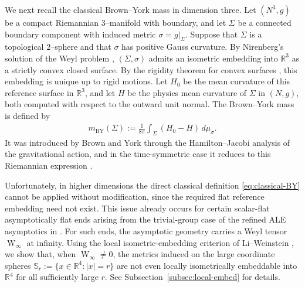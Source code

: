 \documentclass[10pt]{amsart}
\newcommand{\R}{\mathbb{R}}
\newcommand{\Sph}{\mathbb{S}}
\newcommand{\Weyl}{\operatorname{W}}
\theoremstyle{plain}
\theoremstyle{remark}
\begin{document}
	We next recall the classical Brown--York mass in dimension three. Let $(N^3,g)$ be a compact Riemannian
	$3$--manifold with boundary, and let $\Sigma$ be a connected boundary
	component with induced metric $\sigma=g|_\Sigma$. Suppose that $\Sigma$ is
	a topological $2$--sphere and that $\sigma$ has positive Gauss curvature.
	By Nirenberg's solution of the Weyl problem \cite{Nirenberg},
	$(\Sigma,\sigma)$ admits an isometric embedding into $\mathbb R^3$
	as a strictly convex closed surface. By the rigidity theorem for
	convex surfaces \cite{CohnVossen}, this embedding is unique up to
	rigid motions. Let $H_0$ be
	the mean curvature of this reference surface in $\mathbb R^3$, and let
	$H$ be the physics mean curvature of $\Sigma$ in $(N,g)$, both computed with
	respect to the outward unit normal. The Brown--York mass is defined by
	\begin{align}\label{eq:classical-BY}
		m_{\mathrm{BY}}(\Sigma)
		:=
		\frac{1}{8\pi}
		\int_{\Sigma}(H_0-H)\,d\mu_\sigma .
	\end{align}
	It was introduced by Brown and York through the Hamilton--Jacobi analysis
	of the gravitational action, and in the time-symmetric case it reduces to
	this Riemannian expression \cite{BrownYork}.
	
	Unfortunately, in higher dimensions the direct classical definition
	\eqref{eq:classical-BY} cannot be applied without modification, since the
	required flat reference embedding need not exist.  This issue already occurs
	for certain scalar-flat asymptotically flat ends arising from the
	trivial-group case of the refined ALE asymptotics in \cite{YouALE26}.  For
	such ends, the asymptotic geometry carries a Weyl tensor
	$\Weyl_\infty$ at infinity.  Using the local isometric-embedding criterion
	of Li--Weinstein \cite{LiWeinstein}, we show that, when
	$\Weyl_\infty\neq0$, the metrics induced on the large coordinate spheres
	$\Sph_r:=\{x\in\R^4:|x|=r\}$ are not even locally isometrically embeddable
	into $\R^4$ for all sufficiently large $r$.  See
	Subsection~\ref{subsec:local-embed} for details.
	
\end{document}
